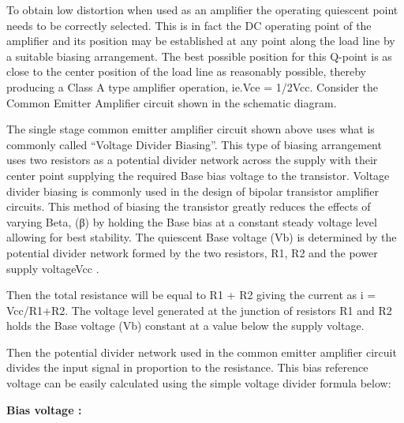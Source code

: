 \documentclass{article}
\newcommand{\tab}[1]{\hspace{.2\textwidth}\rlap{#1}}
\begin{document}
To obtain low distortion when used as an amplifier the operating quiescent point needs to be
correctly selected. This is in fact the DC operating point of the amplifier and its position may be
established at any point along the load line by a suitable biasing arrangement. The best possible
position for this Q-point is as close to the center position of the load line as reasonably possible,
thereby producing a Class A type amplifier operation, ie.Vce = 1/2Vcc. Consider the Common
Emitter Amplifier circuit shown in the schematic diagram.\par 

The single stage common emitter amplifier circuit shown above uses what is commonly called
“Voltage Divider Biasing”. This type of biasing arrangement uses two resistors as a potential divider
network across the supply with their center point supplying the required Base bias voltage to the
transistor. Voltage divider biasing is commonly used in the design of bipolar transistor amplifier
circuits. This method of biasing the transistor greatly reduces the effects of varying Beta, (β) by
holding the Base bias at a constant steady voltage level allowing for best stability. The quiescent
Base voltage (Vb) is determined by the potential divider network formed by the two resistors, R1,
R2 and the power supply voltageVcc . \par

Then the total resistance will be equal to R1 + R2 giving the current as i = Vcc/R1+R2. The voltage
level generated at the junction of resistors R1 and R2 holds the Base voltage (Vb) constant at a
value below the supply voltage. \par

Then the potential divider network used in the common emitter amplifier circuit divides the input
signal in proportion to the resistance. This bias reference voltage can be easily calculated using the
simple voltage divider formula below: \par

\textbf{Bias voltage : } 

\tab{Vb = Vcc R2/R1+R2} \par
\end{document}
